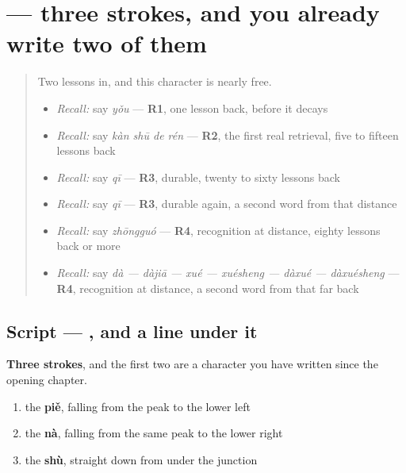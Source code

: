 \section[\texorpdfstring{\zh{个} (gè)}{个 (gè)}]{ — three strokes, and you already write two of them}

\label{lesson:ZH-W24-ge}



\begin{quote}
Two lessons in, and this character is nearly free.

\begin{itemize}
\raggedright
  \item \emph{Recall:} say \emph{yǒu} — \textbf{R1}, one lesson back, before it decays
  \item \emph{Recall:} say \emph{kàn shū de rén} — \textbf{R2}, the first real retrieval, five to fifteen lessons back
  \item \emph{Recall:} say \emph{qī} — \textbf{R3}, durable, twenty to sixty lessons back
  \item \emph{Recall:} say \emph{qī} — \textbf{R3}, durable again, a second word from that distance
  \item \emph{Recall:} say \emph{zhōngguó} — \textbf{R4}, recognition at distance, eighty lessons back or more
  \item \emph{Recall:} say \emph{dà — dàjiā — xué — xuésheng — dàxué — dàxuésheng} — \textbf{R4}, recognition at distance, a second word from that far back
\end{itemize}
\end{quote}

\subsection*{Script — , and a line under it}

\begin{quote}
\end{quote}

\textbf{Three strokes}, and the first two are a character you have written since the opening chapter.

\begin{enumerate}
\raggedright
  \item the \textbf{piě}, falling from the peak to the lower left
  \item the \textbf{nà}, falling from the same peak to the lower right
  \item the \textbf{shù}, straight down from under the junction
\end{enumerate}

